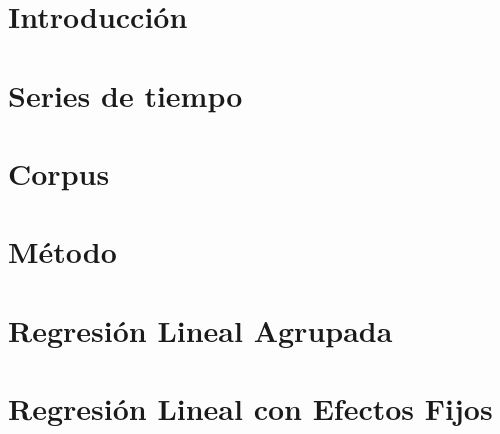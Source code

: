 \documentclass[11pt,a4paper,twoside]{tesis}
\begin{document}
\def\titulo{Licenciado }

\def\autor{Juan Manuel Pérez}
\def\tituloTesis{Mimetización entre interlocutores}
\def\runtitulo{Medición de la mimetización entre interlocutores utilizando series de tiempo}
\def\runtitle{Measuring entrainment between speakers using time series}
\def\director{Agustín Gravano}
\def\codirector{Ramiro Gálvez}
\def\lugar{Buenos Aires, 2015}


\frontmatter
\pagestyle{empty}



\tableofcontents

\mainmatter
\pagestyle{headings}


\newcommand{\ENGMAX} { ENG\_MAX }
\newcommand{\ENGMEAN} { ENG\_MEAN }
\newcommand{\FOMAX} { F0\_MAX }
\newcommand{\FOMEAN} { F0\_MEAN }
\newcommand{\TOTFRAMES} { VCD2TOT\_FRAMES }
\newcommand{\NOISETOHARMONICS} { NOISE\_TO\_HARMONICS\_RATIO }
\newcommand{\SYLCOUNT} { SYLLABES\_COUNT }
\newcommand{\SYLAVG} { SYLLABES\_COUNT }
\newcommand{\LOCALSHIMMER} { SOUND\_VOICED\_LOCAL\_SHIMMER }
\newcommand{\PHONCOUNT} { PHONEMES\_COUNT }
\newcommand{\PHONAVG} { PHONEMES\_AVERAGE }

\newcommand{\estslope} { \widehat{\beta_2} }

\newcommand{\myhighlight} {\rowcolor[gray]{.75}}

\chapter{Introducción}



\chapter{Series de tiempo}





\chapter{Corpus}


\chapter{Método}


%



\chapter{Regresión Lineal Agrupada}


\chapter{Regresión Lineal con Efectos Fijos}



\backmatter


\end{document}
